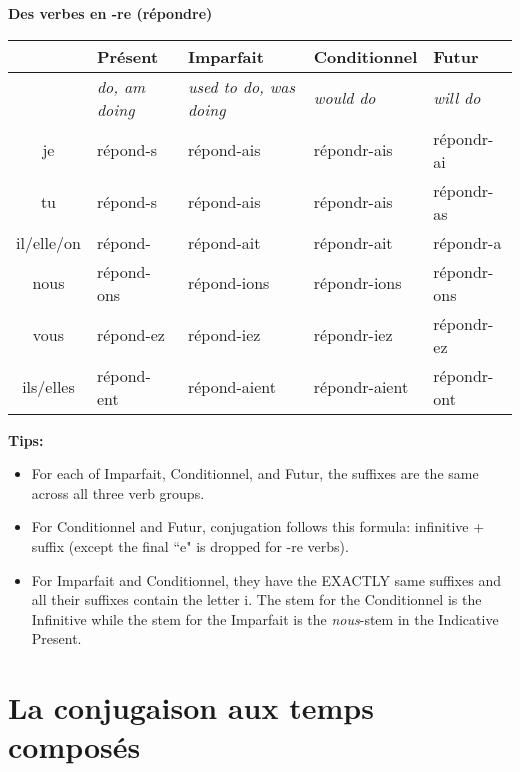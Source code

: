 \vskip 0.5cm
\renewcommand{\stemPresent}{r\'epond}
\renewcommand{\stemFutur}{r\'epondr}
\begin{center}
\textbf{Des verbes en -re (r\'epondre)}
\vskip 0.1cm
\begin{tabular}{|c||L{3cm}|L{3cm}|L{3cm}|L{3cm}|}
\hline
& Pr\'esent & Imparfait & Conditionnel & Futur \\
\hline
& \textit{do, am doing} & \textit{used to do, was doing} & \textit{would do} & \textit{will do} \\
\hline\hline
je           &	\stemPresent-s 	&	\stemPresent-ais	&	\stemFutur-ais	 &	\stemFutur-ai	\\
tu           &	\stemPresent-s	&	\stemPresent-ais	&	\stemFutur-ais	&	\stemFutur-as	\\
il/elle/on &	\stemPresent-	&	\stemPresent-ait	&	\stemFutur-ait	&	\stemFutur-a	\\
nous      &	\stemPresent-ons	&	\stemPresent-ions	&	\stemFutur-ions	&	\stemFutur-ons	\\
vous      &	\stemPresent-ez	&	\stemPresent-iez	&	\stemFutur-iez		&	\stemFutur-ez	\\
ils/elles  &	\stemPresent-ent	&	\stemPresent-aient	&	\stemFutur-aient	&	\stemFutur-ont	\\
\hline
\end{tabular}
\end{center}

\vskip 0.5cm
{\small
\noindent
\textbf{Tips:}
\begin{itemize}
\item	For each of Imparfait, Conditionnel, and Futur, the suffixes are the same across all three verb groups.
\item	For Conditionnel and Futur, conjugation follows this formula: infinitive + suffix (except the final ``e" is dropped for -re verbs).
\item	For {\color{red}I}mparfait and Cond{\color{red}i}tionnel, they have the EXACTLY same suffixes
		and all their suffixes contain the letter {\color{red}i}.
		The stem for the Conditionnel is the Infinitive
		while the stem for the Imparfait is the \textit{nous}-stem in the Indicative Present.
\end{itemize}
}

\clearpage
\section{La conjugaison aux temps compos\'es}
\setcounter{theorem}{0}
\setcounter{equation}{0}

